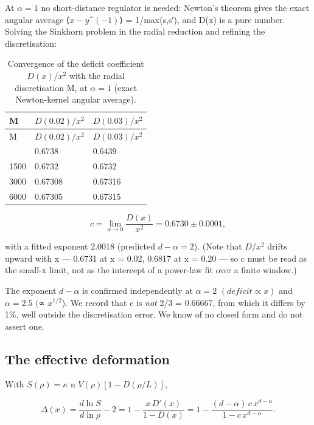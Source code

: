 \documentclass[aps,prd,preprint,nofootinbib,superscriptaddress]{revtex4-2}
\begin{document}
At \(\alpha  = 1\) no short-distance regulator is needed: Newton's
theorem gives the exact angular average
⟨\textbar{}\(x-y\)\textbar\^{}\((-1)\)⟩ = 1/max(s,s′), and D(x) is a
pure number. Solving the Sinkhorn problem in the radial reduction and
refining the discretisation:

\begin{longtable}[]{@{}lll@{}}
\caption{Convergence of the deficit coefficient \(D(x)/x^{2}\) with the
radial discretisation M, at \(\alpha  = 1\) (exact Newton-kernel angular
average).}\tabularnewline
\toprule\noalign{}
M & \(D(0.02)/x^{2}\) & \(D(0.03)/x^{2}\) \\
\midrule\noalign{}
\endfirsthead
\toprule\noalign{}
M & \(D(0.02)/x^{2}\) & \(D(0.03)/x^{2}\) \\
\midrule\noalign{}
\endhead
\bottomrule\noalign{}
\endlastfoot
750 & 0.6738 & 0.6439 \\
1500 & 0.6732 & 0.6732 \\
3000 & 0.67308 & 0.67316 \\
6000 & 0.67305 & 0.67315 \\
\end{longtable}

\begin{equation}c = \lim_{x\to0} \frac{D(x)}{x^2} = 0.6730 \pm 0.0001,\end{equation}

with a fitted exponent 2.0018 (predicted \(d - \alpha  = 2\)). (Note
that \(D/x^{2}\) drifts upward with x --- 0.6731 at x = 0.02, 0.6817 at
x = 0.20 --- so c must be read as the small-x limit, not as the
intercept of a power-law fit over a finite window.)

The exponent \(d - \alpha\) is confirmed independently at
\(\alpha  = 2\) \((deficit \propto  x)\) and \(\alpha  = 2.5\) \((\)∝
\(x^{1/2}\)). We record that c is \emph{not} 2/3 = 0.66667, from which
it differs by 1\%, well outside the discretisation error. We know of no
closed form and do not assert one.

\subsection{The effective deformation}\label{sec-5-2}

With \(S(\rho ) = \kappa\) n \(V(\rho )[1 - D(\rho /L)]\),

\begin{equation}\Delta(x) = \frac{d\ln S}{d\ln\rho} - 2 = 1 - \frac{x\, D'(x)}{1 - D(x)} = 1 - \frac{(d-\alpha)\, c\, x^{d-\alpha}}{1 - c\, x^{d-\alpha}}. \tag{5.2}\end{equation}
\end{document}
